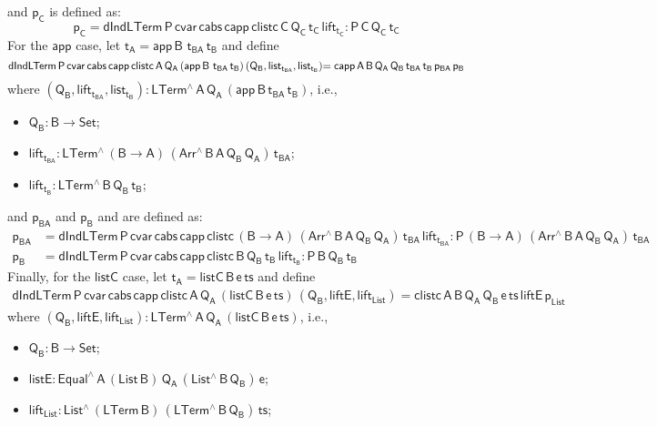 \documentclass[9pt]{entcs}
\begin{document}
and $\mathsf{p_C}$ is defined as:
\[
  \mathsf{p_C =  dIndLTerm\,P\,cvar\,cabs \,capp \,clistc\, C\, Q_C\, t_C\, lift_{t_C}  : P \, C\, Q_C \, t_C }
\]
For the $\mathsf{app}$ case, let $\mathsf{t_A = app \,B \,\,t_{BA} \, t_B} $ and define
\[
  \mathsf{dIndLTerm \, P\, cvar \, cabs\, capp\, clistc \, A\, Q_A\,  (app \,B \,\,t_{BA} \, t_B)\, (Q_B , list_{t_{BA}}, list_{t_B})} \\
  \mathsf{= capp\,A\,B\,Q_A\, Q_B\, t_{BA}\, t_B\, p_{BA} \, p_B}
\]
where $\mathsf{(Q_B , lift_{t_{BA}}, list_{t_B}) : LTerm^{\wedge}\, A\, Q_A\, (app \,B \,t_{BA} \, t_B)}$, i.e.,
\begin{itemize}
  \item $\mathsf{Q_B : B \to Set}$;
  \item $\mathsf{lift_{t_{BA}}: LTerm^{\wedge} \, (B \to A)\, (Arr^{\wedge} \, B\, A\, Q_B \, Q_A)\, t_{BA}}$;
  \item $\mathsf{lift_{t_B}: LTerm^{\wedge} \, B\, Q_B\, t_B}$;
\end{itemize}
and $\mathsf{p_{BA}}$ and $\mathsf{p_B}$
and are defined as:
\begin{align*}
  \mathsf{p_{BA}} &= \mathsf{dIndLTerm\,P\,cvar\,cabs \,capp \,clistc\, (B \to A)\,(Arr^{\wedge} \, B\, A\, Q_B \, Q_A) \, t_{BA}\, lift_{t_{BA}}
  : P \, (B \to A)\, (Arr^{\wedge} \, B\, A\, Q_B \, Q_A) \, t_{BA} } \\
  \mathsf{p_B} &= \mathsf{dIndLTerm\,P\,cvar\,cabs \,capp \,clistc\, B\, Q_B\, t_B\, lift_{t_B}  : P \, B\, Q_B \, t_B } 
\end{align*}
Finally, for the $\mathsf{listC}$ case, let $\mathsf{t_A = listC \,B \,e \, ts}$ and define
\begin{multline*}
  \mathsf{dIndLTerm \, P\, cvar \, cabs\, capp\, clistc \, A\, Q_A\, (listC \,B \,e \, ts) \, (Q_B , liftE, lift_{List})
  = clistc \,A\,B\,Q_A\, Q_B\, e\, ts\, liftE\, p_{List} }
\end{multline*}
where $\mathsf{(Q_B , liftE, lift_{List}): LTerm^{\wedge}\, A\, Q_A\, (listC \,B \,e \, ts)}$, i.e.,
\begin{itemize}
  \item $\mathsf{Q_B : B \to Set}$;
  \item $\mathsf{listE : Equal^{\wedge}\, A\, (List\,B)\, Q_A\, (List^{\wedge}\, B\, Q_B)\, e}$;
  \item $\mathsf{lift_{List}: List^{\wedge} \, (LTerm\, B) \, (LTerm^{\wedge}\, B\, Q_B) \, ts}$;
\end{itemize}
\end{document}
